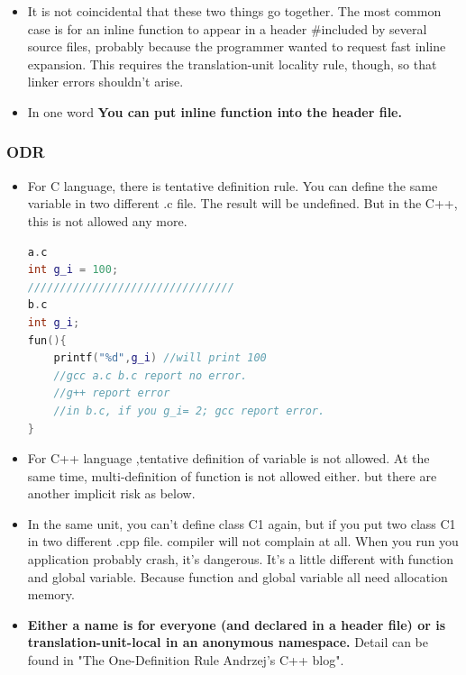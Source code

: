 \documentclass[a4paper,11pt,twoside]{book}
\begin{document}
\begin{itemize}
	\item It is not coincidental that these two things go together. The most common case is for an inline function to appear in a header \#included by several source files, probably because the programmer wanted to request fast inline expansion. This requires the translation-unit locality rule, though, so that linker errors shouldn't arise.
	
	\item In one word \textbf{You can put inline function into the header file.}
	
\end{itemize}

\subsubsection{ODR}
\begin{itemize}
	
	\item For C language, there is tentative definition rule. You can define the same variable in two different .c file. The result will be undefined. But in the C++, this is not allowed any more. 
	
\begin{lstlisting}[frame=single, language=c++]
a.c
int g_i = 100;
////////////////////////////////
b.c
int g_i;
fun(){
	printf("%d",g_i) //will print 100
	//gcc a.c b.c report no error.
	//g++ report error
	//in b.c, if you g_i= 2; gcc report error.
}
\end{lstlisting}
	
	\item For C++ language ,tentative definition of variable is not allowed. At the same time, multi-definition of function is not allowed either. but there are another implicit risk as below. 
	
	\item In the same unit, you can't define class C1 again, but if you put two class C1 in two different .cpp file. compiler will not complain at all. When you run you application probably crash, it's dangerous. It's a little different with function and global variable. Because function and global variable all need allocation memory.
	
	\item \textbf{Either a name is for everyone (and declared in a header file) or is translation-unit-local in an anonymous namespace.} Detail can be found in "The One-Definition Rule  Andrzej's C++ blog".
	
\end{itemize}
\end{document}
